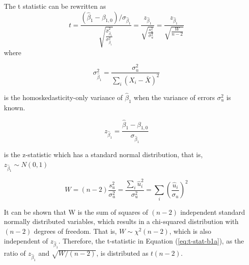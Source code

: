 \documentclass[a4paper,11pt]{article}
\begin{document}
The t statistic can be rewritten as
\begin{equation}
\label{eq:t-stat-b1a}
t = \frac{(\hat{\beta}_1 - \beta_{1,0})/\sigma_{\hat{\beta}_1}}{\sqrt{\frac{\hat{\sigma}^2_{\hat{\beta}_1}}{\sigma^2_{\hat{\beta}_1}}}} 
= \frac{z_{\hat{\beta}_1}}{\sqrt{\frac{s^2_u}{\sigma^2_u}}} = \frac{z_{\hat{\beta}_1}}{\sqrt{\frac{W}{n-2}}}
\end{equation}
where 

\[\sigma^2_{\hat{\beta}_1} = \frac{\sigma^2_u}{\sum_i (X_i -
\bar{X})^2} \] 

is the homoskedasticity-only variance of
\(\hat{\beta}_1\) when the variance of errors \(\sigma^2_u\) is known.  

\[
z_{\hat{\beta}_1} =\frac{\hat{\beta}_1 -
\beta_{1,0}}{\sigma_{\hat{\beta}_1}} 
\] 

is the z-statistic which has a standard normal distribution, that is,
\(z_{\hat{\beta}_1} \sim N(0, 1)\)

\[ 
W = (n-2)\frac{s^2_u}{\sigma^2_u} =
\frac{\sum_i\hat{u}_i^2}{\sigma^2_u} = \sum_i
\left(\frac{\hat{u}_i}{\sigma_u}\right)^2
 \] 

It can be shown that W is the sum of squares of \((n-2)\) independent
standard normally distributed variables, which results in a
chi-squared distribution with \((n-2)\) degrees of freedom. That is, \(W
\sim \chi^2(n-2)\), which is also independent of
\(z_{\hat{\beta}_1}\). Therefore, the t-statistic in Equation
(\ref{eq:t-stat-b1a}), as the ratio of \(z_{\hat{\beta}_1}\) and
\(\sqrt{W/(n-2)}\), is distributed as \(t(n-2)\).
\end{document}
